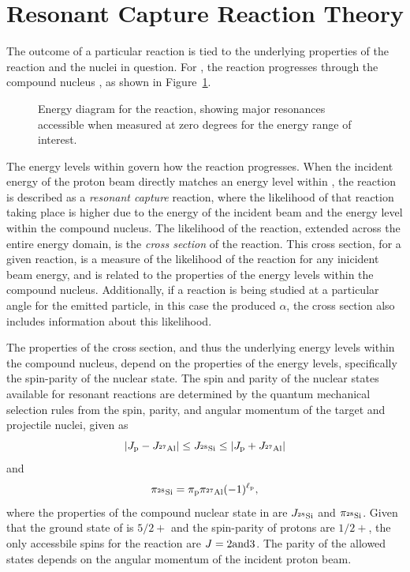 
\section{Resonant Capture Reaction Theory}

The outcome of a particular reaction is tied to the underlying properties of
the reaction and the nuclei in question. For \alpa{}, the reaction progresses
through the compound nucleus , as shown in Figure~\ref{fig:alpa}.

\begin{figure}[t]
    \begin{center}
        \label{fig:alpa}
        \caption[Energy diagram for the \alpa{} reaction]{Energy diagram for
            the \alpa{} reaction, showing major resonances accessible when
            measured at zero degrees for the energy range of interest.}
    \end{center}
\end{figure}

The energy levels within  govern how the reaction progresses. When
the incident energy of the proton beam directly matches an energy level within
, the reaction is described as a \emph{resonant capture} reaction,
where the likelihood of that reaction taking place is higher due to the energy
of the incident beam and the energy level within the compound nucleus. The
likelihood of the reaction, extended across the entire energy domain, is the
\emph{cross section} of the reaction. This cross section, for a given reaction,
is a measure of the likelihood of the reaction for any inicident beam energy,
and is related to the properties of the energy levels within the compound
nucleus. Additionally, if a reaction is being studied at a particular angle for
the emitted particle, in this case the produced $\alpha$, the cross section
also includes information about this likelihood.

The properties of the cross section, and thus the underlying energy levels
within the compound nucleus, depend on the properties of the energy levels,
specifically the spin-parity of the nuclear state. The spin and parity of the
nuclear states available for resonant reactions are determined by the quantum
mechanical selection rules from the spin, parity, and angular momentum of the
target and projectile nuclei, given as
\[
    \left|J_{\rm{p}} - J_{{}^{27}\textrm{Al}}\right|
    \leq J_{{}^{28}\textrm{Si}} \leq
    \left|J_{\rm{p}} + J_{{}^{27}\textrm{Al}}\right|
\]
and
\[
    \pi_{{}^{28}\textrm{Si}} = \pi_{\rm{p}}\pi_{{}^{27}\textrm{Al}}(-1)^{\ell_{\rm{p}}},
\]
where the properties of the compound nuclear state in  are
$J_{{}^{28}\textrm{Si}}$ and $\pi_{{}^{28}\textrm{Si}}$. Given that the ground state of
 is $5/2+$ and the spin-parity of protons are $1/2+$, the only
accessbile spins for the reaction are $J = 2\rm{ and }3$. The parity of the
allowed states depends on the angular momentum of the incident proton beam.

